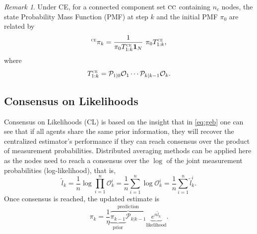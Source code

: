 \documentclass[journal]{IEEEtran}
\theoremstyle{remark}
\newtheorem{remark}{Remark}
\newcommand{\suf}[1]{\textsc{\tiny #1}}  %
\theoremstyle{definition}
\begin{document}
\begin{remark}
 Under CE, for a connected component set $\textsc{cc}$ containing $n_{c}$ nodes, 
 the state Probability Mass Function (PMF) at step $k$ and the initial PMF $\pi_{0}$ are
 related by
 \begin{equation}
 {}^{\suf{CE}}{\pi}_{k} = \frac{1}{{\pi}_{0}T_{1:k}^{\suf{CE}}\mathbf{1}_N}\,\,{\pi_{0}}T_{1:k}^{\suf{CE}},\label{CE-UPDATE} 
 \end{equation}
 where  
 \begin{equation}
 {T}_{1:k}^{\suf{CE}} =\mathcal{P}_{1\vert0}\mathcal{O}_{1}\cdots\mathcal{P}_{k\vert k-1}\mathcal{O}_{k}.
 \end{equation}
\end{remark}

\subsection{Consensus on Likelihoods}
Consensus on Likelihoods (CL) is based on the insight that in \eqref{eq:geb}
one can see that if all agents share the same prior information, they will
recover the centralized estimator's performance if they can reach 
consensus over the product of measurement probabilities. Distributed averaging methods
can be applied here as the nodes need to reach a consensus over the $\log$ of
the joint measurement probabilities (log-likelihood), that is,
\begin{equation}
\tilde{l}_k  = \frac{1}{n} \log \prod_{i=1}^{n} \mathcal{O}_k^i  = \frac{1}{n} \sum_{i=1}^{n} \log \mathcal{O}_k^i = \frac{1}{n} \sum_{i=1}^{n} \tilde{l}_k^i.
\end{equation}
Once consensus is reached, the updated estimate is 
\begin{equation}
\label{eq:dlc}
{\pi}_{k}  = \frac{1}{\eta}\overbrace{ \underbrace{{\pi}_{k-1}}_{\text{prior}} 
\mathcal{P}_{k \vert k-1}  
}^{\text{prediction}}\underbrace{e^{n\tilde{l}_k}}_{\text{likelihood}}.
\end{equation}
\end{document}
